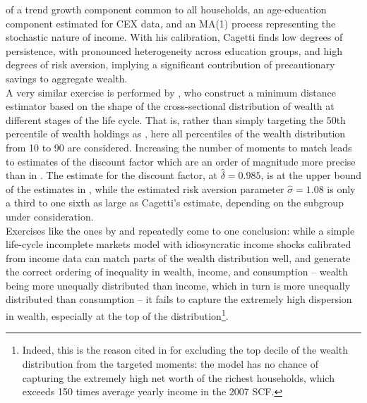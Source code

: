 of a trend growth component common to all households, an age-education component
estimated for CEX data, and an MA(1) process representing the stochastic nature
of income. With his calibration, Cagetti finds low degrees of persistence, with
pronounced heterogeneity across education groups, and high degrees of risk 
aversion, implying a significant contribution of precautionary savings to 
aggregate wealth. \\
A very similar exercise is performed by \citet{HintermaierKoeniger2011}, who 
construct a minimum distance estimator based on the shape of the cross-sectional
distribution of wealth at different stages of the life cycle. That is, rather
than simply targeting the 50th percentile of wealth holdings  as 
\citet{Cagetti2003}, here all percentiles of the wealth distribution from 10 
to 90 are considered. Increasing the number of moments to match leads to estimates 
of the discount factor which are an order of magnitude more precise than in 
\citet{Cagetti2003}. The estimate for the discount factor, at $\hat{\delta}=0.985$, 
is at the upper bound of the estimates in \citet{Cagetti2003}, while the 
estimated risk aversion parameter $\hat{\sigma}=1.08$ is only a third to one 
sixth as large as Cagetti's estimate, depending on the subgroup under consideration. \\
Exercises like the ones by \citet{Cagetti2003} and \citet{HintermaierKoeniger2011}
repeatedly come to one conclusion: while a simple life-cycle incomplete markets
model with idiosyncratic income shocks calibrated from income data can match 
parts of the wealth distribution well, and generate the correct ordering of 
inequality in wealth, income, and consumption -- wealth being more unequally 
distributed than income, which in turn is more unequally distributed than 
consumption -- it fails to capture the extremely high dispersion in wealth, 
especially at the top of the distribution\footnote{Indeed, this is the reason
cited in \citet{HintermaierKoeniger2011} for excluding the top decile of the 
wealth distribution from the targeted moments: the model has no chance of capturing
the extremely high net worth of the richest households, which exceeds 150 times
average yearly income in the 2007 SCF.}. 

